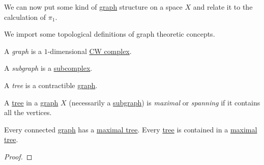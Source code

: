 We can now put some kind of \hyperref[def:graph]{graph} structure on a space \(X\) and relate it to the calculation of \(\pi _1\).

\begin{definition*}
	We import some topological definitions of graph theoretic concepts.
	\begin{definition}[Graph]\label{def:graph}
		A \emph{graph} is a \(1\)-dimensional \hyperref[def:CW-Complex]{CW complex}.
	\end{definition}
	\begin{definition}[Subgraph]\label{def:subgraph}
		A \emph{subgraph} is a \hyperref[def:CW-subcomplex]{subcomplex}.
	\end{definition}
	\begin{definition}[Tree]\label{def:tree}
		A \emph{tree} is a contractible \hyperref[def:graph]{graph}.
	\end{definition}
	\begin{definition}\label{def:maximal-tree}
		A \hyperref[def:tree]{tree} in a \hyperref[def:graph]{graph} \(X\) (necessarily a \hyperref[def:subgraph]{subgraph}) is
		\emph{maximal} or \emph{spanning} if it contains all the vertices.
	\end{definition}
\end{definition*}

\begin{theorem}
	Every connected \hyperref[def:graph]{graph} has a \hyperref[def:maximal-tree]{maximal tree}.
	Every \hyperref[def:tree]{tree} is contained in a \hyperref[def:maximal-tree]{maximal tree}.
\end{theorem}
\begin{proof}
\end{proof}

